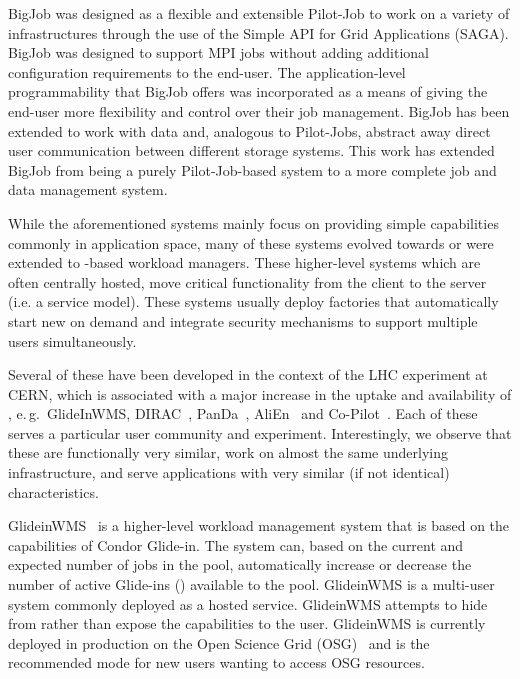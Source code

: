 \documentclass{sig-alternate}
\begin{document}
BigJob was designed as a flexible and extensible Pilot-Job to work on a variety
of infrastructures through the use of the Simple API for Grid Applications
(SAGA).
BigJob was designed to support MPI jobs without adding additional configuration
requirements to the end-user.
The application-level programmability that BigJob offers was incorporated as a
means of giving the end-user more flexibility and control over their job
management.
BigJob has been extended to work with data and, analogous to Pilot-Jobs,
abstract away direct user communication between different storage systems.
This work has extended BigJob from being a purely Pilot-Job-based system to a
more complete job and data management system.

While the aforementioned systems mainly focus on providing simple
\pilot capabilities commonly in application space, many of these systems
evolved towards or were extended to \pilot-based workload managers.
These higher-level systems which are often centrally hosted, move critical
functionality from the client to the server (i.e. a service model).
These systems usually deploy \pilot factories that automatically start new
\pilots on demand and integrate security mechanisms to support multiple users
simultaneously.

Several of these have been developed in the context of the LHC
experiment at CERN, which is associated with a major increase in the
uptake and availability of \pilots, e.\,g.\ GlideInWMS,
DIRAC~\cite{1742-6596-219-6-062049},
PanDa~\cite{1742-6596-331-7-072069},
AliEn~\cite{1742-6596-119-6-062012} and Co-Pilot~\cite{copilot-tr}.
Each of these \pilots serves a particular user community and
experiment. Interestingly, we observe that these \pilots are
functionally very similar, work on almost the same underlying
infrastructure, and serve applications with very similar (if not
identical) characteristics.

GlideinWMS~\cite{1742-6596-119-6-062044} is a higher-level workload management
system that is based on the \pilot capabilities of Condor Glide-in.
The system can, based on the current and expected number of jobs in the pool,
automatically increase or decrease the number of active Glide-ins (\pilots)
available to the pool.
GlideinWMS is a multi-user \pilotjob system commonly deployed as a hosted
service.
GlideinWMS attempts to hide from rather than expose the \pilot capabilities to
the user.
GlideinWMS is currently deployed in production on the Open Science Grid
(OSG)~\cite{url_osg} and is the recommended mode for new users wanting to
access OSG resources.
\end{document}
